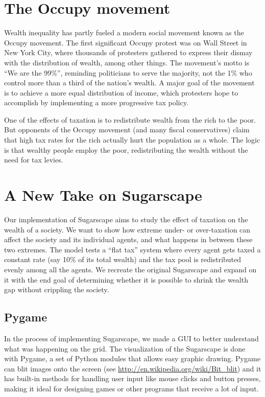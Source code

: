 \documentclass[10pt]{book}
\begin{document}
\section{The Occupy movement}

Wealth inequality has partly fueled a modern social movement known as
the Occupy movement.  The first significant Occupy protest was on Wall
Street in New York City, where thousands of protesters gathered to
express their dismay with the distribution of wealth, among other
things. The movement's motto is ``We are the 99\%'', reminding
politicians to serve the majority, not the 1\% who control more than a
third of the nation's wealth. A major goal of the movement is to
achieve a more equal distribution of income, which protesters hope to
accomplish by implementing a more progressive tax policy.

One of the effects of taxation is to redistribute wealth
from the rich to the poor.  But opponents of the Occupy movement (and
many fiscal conservatives) claim that high tax rates for the
rich actually hurt the population as a whole.  The logic is that
wealthy people employ the poor, redistributing the wealth without the
need for tax levies.


\section{A New Take on Sugarscape}

Our implementation of Sugarscape aims to study the effect of taxation
on the wealth of a society. We want to show how extreme under- or
over-taxation can affect the society and its individual agents, and
what happens in between these two extremes. The model tests a “flat
tax” system where every agent gets taxed a constant rate (say 10\% of
its total wealth) and the tax pool is redistributed evenly among all
the agents. We recreate the original Sugarscape and expand on it with
the end goal of determining whether it is possible to shrink the wealth gap
without crippling the society.


\subsection{Pygame}

In the process of implementing Sugarscape, we made a GUI to better
understand what was happening on the grid. The visualization of the
Sugarscape is done with Pygame, a set of Python modules that allows
easy graphic drawing. Pygame can blit images onto the screen (see
\url{http://en.wikipedia.org/wiki/Bit_blit}) and it has built-in
methods for handling user input like mouse clicks and button presses,
making it ideal for designing games or other programs that receive a
lot of input.
\end{document}
